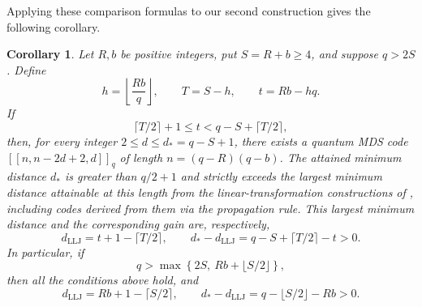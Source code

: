 \documentclass[preprint,12pt,a4paper]{elsarticle}
\newtheorem{corollary}[theorem]{Corollary}
\newcommand{\qcode}[3]{\left[\!\left[#1,#2,#3\right]\!\right]_q}
\begin{document}
Applying these comparison formulas to our second construction gives the following corollary.

\begin{corollary}\label{cor:second-comparison}
Let $R,b$ be positive integers, put $S=R+b\ge4$, and suppose $q>2S$. Define
\[
 h=\left\lfloor\frac{Rb}{q}\right\rfloor,
 \qquad T=S-h,\qquad t=Rb-hq.
\]
If
\[
 \lceil T/2\rceil+1\le t<q-S+\lceil T/2\rceil,
\]
then, for every integer $2\le d\le d_*=q-S+1$, there exists a quantum MDS code $\qcode{n}{n-2d+2}{d}$ of length $n=(q-R)(q-b)$. The attained minimum distance $d_*$ is greater than $q/2+1$ and strictly exceeds the largest minimum distance attainable at this length from the linear-transformation constructions of \cite{LiLiuJiang2026}, including codes derived from them via the propagation rule. This largest minimum distance and the corresponding gain are, respectively,
\[
 d_{\mathrm{LLJ}}=t+1-\lceil T/2\rceil,
 \qquad d_*-d_{\mathrm{LLJ}}=q-S+\lceil T/2\rceil-t>0.
\]
In particular, if
\begin{equation}\label{eq:second-two-parameter}
 q>\max\left\{2S,\ Rb+\lfloor S/2\rfloor\right\},
\end{equation}
then all the conditions above hold, and
\[
 d_{\mathrm{LLJ}}=Rb+1-\lceil S/2\rceil,
 \qquad d_*-d_{\mathrm{LLJ}}=q-\lfloor S/2\rfloor-Rb>0.
\]
\end{corollary}
\end{document}
